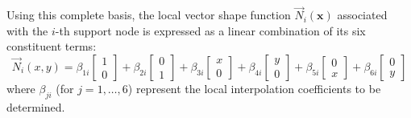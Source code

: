 \documentclass[preprint,12pt]{elsarticle}
\begin{document}
Using this complete basis, the local vector shape function $\vec{N}_i(\mathbf{x})$ associated with the $i$-th support node is expressed as a linear combination of its six constituent terms:
\begin{equation}
\vec{N}_i(x, y) = \beta_{1i} \begin{bmatrix} 1 \\ 0 \end{bmatrix} + \beta_{2i} \begin{bmatrix} 0 \\ 1 \end{bmatrix} + \beta_{3i} \begin{bmatrix} x \\ 0 \end{bmatrix} + \beta_{4i} \begin{bmatrix} y \\ 0 \end{bmatrix} + \beta_{5i} \begin{bmatrix} 0 \\ x \end{bmatrix} + \beta_{6i} \begin{bmatrix} 0 \\ y \end{bmatrix}
\label{eq:P1_shape_function_expansion}
\end{equation}
where $\beta_{ji}$ (for $j=1, \dots, 6$) represent the local interpolation coefficients to be determined.
\end{document}
